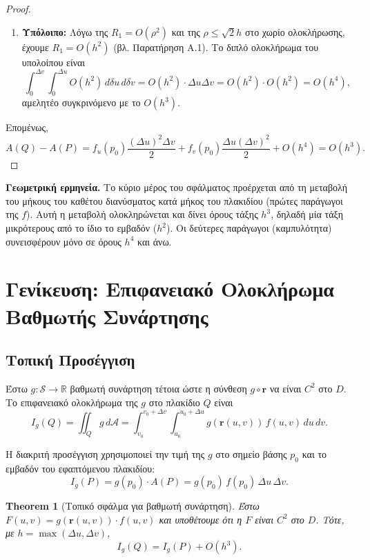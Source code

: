 \documentclass[10pt,a4paper,twoside,openany]{book}
\theoremstyle{plain}
\newtheorem{theorem}{Theorem}[section]
\theoremstyle{definition}
\theoremstyle{remark}
\numberwithin{equation}{section}
\begin{document}
\begin{proof}
\begin{enumerate}
\item \textbf{Υπόλοιπο:}
Λόγω της \(R_1 = O(\rho^2)\) και της \(\rho \le \sqrt{2}h\) στο χωρίο ολοκλήρωσης, έχουμε \(R_1 = O(h^2)\) (βλ. Παρατήρηση Α.1). Το διπλό ολοκλήρωμα του υπολοίπου είναι
\[
\int_0^{\Delta v} \int_0^{\Delta u} O(h^2) \, d\delta u \, d\delta v = O(h^2) \cdot \Delta u \Delta v = O(h^2) \cdot O(h^2) = O(h^4),
\]
αμελητέο συγκρινόμενο με το \(O(h^3)\).
\end{enumerate}

Επομένως,
\[
A(Q) - A(P) = f_u(p_0) \frac{(\Delta u)^2 \Delta v}{2} + f_v(p_0) \frac{\Delta u (\Delta v)^2}{2} + O(h^4) = O(h^3).
\]
\end{proof}

\textbf{Γεωμετρική ερμηνεία.} Το κύριο μέρος του σφάλματος προέρχεται από τη μεταβολή του μήκους του καθέτου διανύσματος κατά μήκος του πλακιδίου (πρώτες παράγωγοι της \(f\)). Αυτή η μεταβολή ολοκληρώνεται και δίνει όρους τάξης \(h^3\), δηλαδή μία τάξη μικρότερους από το ίδιο το εμβαδόν (\(h^2\)). Οι δεύτερες παράγωγοι (καμπυλότητα) συνεισφέρουν μόνο σε όρους \(h^4\) και άνω.

\section{Γενίκευση: Επιφανειακό Ολοκλήρωμα Βαθμωτής Συνάρτησης}

\subsection{Τοπική Προσέγγιση}

Έστω \(g: \mathcal{S} \to \mathbb{R}\) βαθμωτή συνάρτηση τέτοια ώστε η σύνθεση \(g \circ \mathbf{r}\) να είναι \(C^2\) στο \(D\). Το επιφανειακό ολοκλήρωμα της \(g\) στο πλακίδιο \(Q\) είναι
\[
I_g(Q) = \iint_Q g \, d\mathcal{A} = \int_{v_0}^{v_0+\Delta v} \int_{u_0}^{u_0+\Delta u} g(\mathbf{r}(u,v)) \, f(u,v) \, du \, dv.
\]

Η διακριτή προσέγγιση χρησιμοποιεί την τιμή της \(g\) στο σημείο βάσης \(p_0\) και το εμβαδόν του εφαπτόμενου πλακιδίου:
\[
I_g(P) = g(p_0) \cdot A(P) = g(p_0) \, f(p_0) \, \Delta u \, \Delta v.
\]

\begin{theorem}[Τοπικό σφάλμα για βαθμωτή συνάρτηση]
\label{thm:local_scalar}
Έστω \(F(u,v) = g(\mathbf{r}(u,v)) \cdot f(u,v)\) και υποθέτουμε ότι η \(F\) είναι \(C^2\) στο \(D\). Τότε, με \(h = \max(\Delta u, \Delta v)\),
\[
I_g(Q) = I_g(P) + O(h^3).
\]
\end{theorem}
\end{document}
